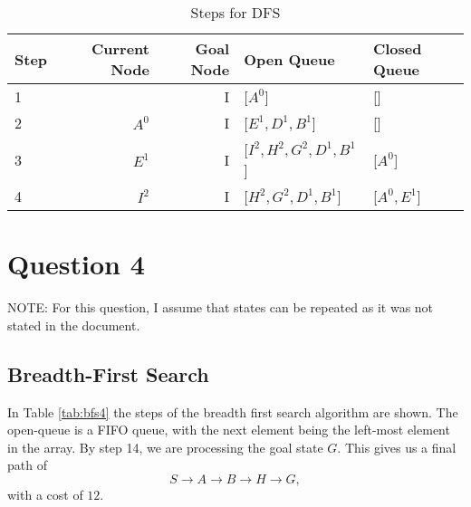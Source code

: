 \documentclass{article}
\begin{document}
    \begin{table}[!htp]\centering
        \caption{Steps for DFS}\label{tab:dfs3}
        \scriptsize
        \begin{tabular}{lrrll}\toprule
        Step &Current Node &Goal Node & Open Queue &Closed Queue  \\\midrule
        1&  &I &[$A^0$] &[] \\
        2& $A^0$ &I &[$E^1, D^1, B^1$] &[] \\
        3& $E^1$ &I &[$I^2, H^2, G^2, D^1, B^1$] &[$A^0$] \\
        4& $I^2$ &I &[$H^2, G^2, D^1, B^1$] &[$A^0, E^1$] \\
        \end{tabular}
    \end{table}


\section{Question 4}
    NOTE: For this question, I assume that states can be repeated as it was not stated in the document.
\subsection{Breadth-First Search}
    In Table \ref{tab:bfs4} the steps of the breadth first search algorithm are shown. The open-queue is a FIFO queue, with the next element being the left-most element in the array.
    By step 14, we are processing the goal state $G$. This gives us a final path of
    \begin{equation}
        S \rightarrow A  \rightarrow B \rightarrow H \rightarrow G,
    \end{equation}
    with a cost of $12$.
\end{document}
